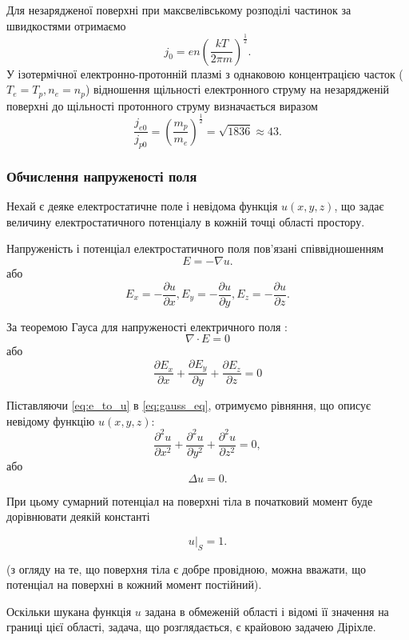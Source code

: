 \documentclass[a4paper,12pt]{article}
\begin{document}
Для незарядженої поверхні при максвелівському розподілі частинок за швидкостями отримаємо
\begin{equation} \label{eq:density}
j_0 = e n \left( \frac{kT}{2 \pi m} \right)^\frac{1}{2}.
\end{equation}
У ізотермічної електронно-протонній плазмі з однаковою концентрацією часток ($T_e = T_p, n_e = n_p$) відношення щільності електронного струму на незарядженій поверхні до щільності протонного струму визначається виразом \cite{novikov}
\[
\frac{j_{e0}}{j_{p0}} = \left( \frac{m_p}{m_e} \right)^\frac{1}{2} = \sqrt{1836} \approx 43.
\]

\subsubsection{Обчислення напруженості поля}

Нехай є деяке електростатичне поле і невідома функція $u(x,y,z)$, що задає величину електростатичного потенціалу в кожній точці області простору.

Напруженість і потенціал електростатичного поля пов’язані співвідношенням
\[
E = -\nabla u.
\]
або
\begin{equation} \label{eq:e_to_u}
E_x = -\frac{\partial u}{\partial x}, E_y = -\frac{\partial u}{\partial y}, E_z = -\frac{\partial u}{\partial z}.
\end{equation}

За теоремою Гауса для напруженості електричного поля \cite{magnet}:
\[
\nabla \cdot E = 0
\]
або
\begin{equation} \label{eq:gauss_eq}
\frac{\partial E_x}{\partial x} + \frac{\partial E_y}{\partial y} + \frac{\partial E_z}{\partial z} = 0
\end{equation}

Піставляючи \ref{eq:e_to_u} в \ref{eq:gauss_eq}, отримуємо рівняння, що описує невідому функцію $u(x,y,z)$:
\[
\frac{\partial ^2 u}{\partial x^2} + \frac{\partial ^2 u}{\partial y^2} + \frac{\partial ^2 u}{\partial z^2} = 0,
\] або
\[
\Delta u = 0.
\]

При цьому сумарний потенціал на поверхні тіла в початковий момент буде дорівнювати деякій константі

\[
\left.u\right|_S = 1.
\]

(з огляду на те, що поверхня тіла є добре провідною, можна вважати, що потенціал на поверхні в кожний момент постійний).

Оскільки шукана функція $u$ задана в обмеженій області і відомі її значення на границі цієї області, задача, що розглядається, є крайовою задачею Діріхле.
\end{document}

